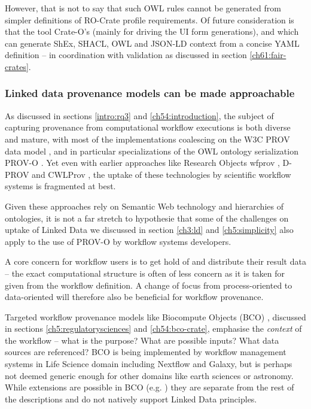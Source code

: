 However, that is not to say that such OWL rules cannot be generated from simpler definitions of RO-Crate profile requirements. Of future consideration is that the tool Crate-O's   (mainly for driving the UI form generations), and  which can generate ShEx, SHACL, OWL and JSON-LD context from a concise YAML definition -- in coordination with validation as discussed in section \vref{ch61:fair-crates}.




\subsubsection{Linked data provenance models can be made approachable}

As discussed in sections \vref{intro:rq3} and \vref{ch54:introduction}, the subject of capturing provenance from computational workflow executions is both diverse and mature, with most of the implementations coalescing on the W3C PROV data model \cite{Moreau 2013}, and in particular specializations of the OWL ontology serialization PROV-O \cite{Lebo 2013a}. Yet even with earlier approaches like Research Objects wfprov \cite{Belhajjame 2015}, D-PROV \cite{Missier 2013} and CWLProv \cite{Khan 2019}, the uptake of these technologies by scientific workflow systems is fragmented at best.

Given these approaches rely on Semantic Web technology and hierarchies of ontologies, it is not a far stretch to hypothesie that some of the challenges on uptake of Linked Data we discussed in section \vref{ch3:ld} and \vref{ch5:simplicity} also apply to the use of PROV-O by workflow systems developers. 

A core concern for workflow users is to get hold of and distribute their result data -- the exact computational structure is often of less concern as it is taken for given from the workflow definition. A change of focus from process-oriented to data-oriented will therefore also be beneficial for workflow provenance. 

Targeted workflow provenance models like Biocompute Objects (BCO) \cite{IEEE 2791-2020,Alterovitz 2018}, discussed in sections \vref{ch5:regulatorysciences} and \vref{ch54:bco-crate}, emphasise the \emph{context} of the workflow -- what is the purpose? What are possible inputs? What data sources are referenced?  BCO is being implemented by workflow management systems in Life Science domain including Nextflow and Galaxy, but is perhaps not deemed generic enough for other domains like earth sciences or astronomy.  While extensions are possible in BCO (e.g. ) they are separate from the rest of the descriptions and do not natively support Linked Data principles.

